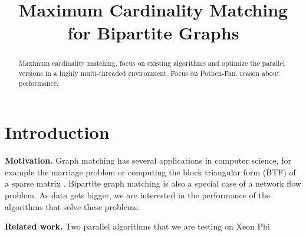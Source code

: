 \documentclass[letterpaper]{article}
\title{Maximum Cardinality Matching for Bipartite Graphs}
\newcommand{\mypar}[1]{{\bf #1.}}
\begin{document}
%
\maketitle
%


\begin{abstract}
Maximum cardinality matching, focus on existing algorithms and optimize the parallel versions in a highly multi-threaded environment. Focus on Pothen-Fan, reason about performance.
\end{abstract}

\section{Introduction}\label{sec:intro}

\mypar{Motivation} Graph matching has several applications in computer science, for example the marriage problem or computing the block triangular form (BTF) of a sparse matrix \cite{Pothen:1990}. Bipartite graph matching is also a special case of a network flow problem. As data gets bigger, we are interested in the performance of the algorithms that solve these problems.

\mypar{Related work} Two parallel algorithms that we are testing on Xeon Phi \cite{Azad:2012} \cite{Azad:2015} 

%
%
%
%
\end{document}
